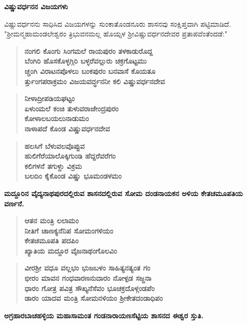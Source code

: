 \noindent
\textbf{ವಿಷ್ಣುವರ್ಧನನ ವಿಜಯಗಳು}

ವಿಷ್ಣುವರ್ಧನನು ಸಾಧಿಸಿದ ವಿಜಯಗಳನ್ನು ಸುಂಕಾತೊಂಡನೂರು ಶಾಸನವು ಸಂಕ್ಷಿಪ್ತವಾಗಿ ಪಟ್ಟಿಮಾಡಿದೆ. "ಶ‍್ರೀಮನ್ಮಹಾಮಂಡಲೇಶ್ವರಂ ತ್ರಿಭುವನಮಲ್ಲ ಹೊಯ್ಸಳ ಶ‍್ರೀವಿಷ್ಣುವರ್ಧನದೇವರ ಪ್ರತಾಪವೆಂತೆಂದಡೆ:"

\begin{verse}
\textbf{ನಂಗಲಿ ಕೊಂಗು ಸಿಂಗಮಲೆ ರಾಯಪುರಂ ತಳಕಾಡುರೊದ್ದ \\ ಬೆಂಗಿರಿ ಹೊಸಕೊಳ್ಳಗ್ಗಿರಿ ಬಳ್ಳರೆವಲ್ಲುರು ಚಕ್ರಗೊಟ್ಟಮು \\ ಚ್ಚಂಗಿ ವಿರಾಟನಪೊಳಲು ಬಂಕಪುರಂ ಬನವಾಸೆ ಕೊಯತೂ \\ರ್ತ್ತುಂಗಪರಾಕ್ರಮಂ ವಿಜಯವರ್ದ್ಧನನೀ ಕಲಿ ವಿಷ್ಣುವರ್ಧನದೇವ}
\end{verse}

\begin{verse}
\textbf{ನೀಳಾದ್ರೀಪಡಿಯಘಟ್ಟಂ \\ ಏಳುಂಮಲೆ ಕಂಚಿ ತುಳುವರಾಜೇಂದ್ರಪುರಂ \\ ಕೋಳಾಲಬಯಲುನಾಡುಮಂ \\ ನಾಳಾಪದೆ ಕೊಂಡ ವಿಷ್ಣುವರ್ಧನದೇವ}
\end{verse}

\begin{verse}
\textbf{ಹಲಸಿಗೆ ಬೆಳುವಲವೊಪ್ಪುವ \\ ಹುಲಿಗೆರೆಯಾಲೊಕ್ಕಿಗುಂಡಿ ಹೆದ್ದರೆವರೆಗಂ \\ ಕಲಿಗಳನೆ ತಗುಳ್ದು ವಿಕ್ರಮ \\ ಬಲದಿಂ ಕೈಕೊಂಡ ವಿಷ್ಣು ಭೂಮಂಡಳಮಂ}
\end{verse}

\noindent
\textbf{ಮದ್ದೂರಿನ ವೈದ್ಯನಾಥಪುರದಲ್ಲಿರುವ ಶಾಸನದಲ್ಲಿರುವ ಸೋಮ ದಂಡನಾಯಕನ ಅಳಿಯ ಕೇತಚಮೂಪತಿಯ ವರ್ಣನೆ.}

\begin{verse}
\textbf{ಆತನ ಮಂತ್ರಿ ಲಲಾಮಂ \\ ನೀತಿಗೆ ಚಾಣಕ್ಯನೆನಿಪ ಸೋಮಂಗಳಿಯಂ \\ ಕೇತಚಮೂಪತಿ ಪದಪಿಂ \\ ಖ್ಯಾತಿಯ ಮದ್ದೂರ ವೈಜನಾಥಂಗೊಲವಿಂ}
\end{verse}

\begin{verse}
\textbf{ವೀರಶ‍್ರೀ ವಧೂ ವಲ್ಲಭಂ ಭುಜಬಳಂ ಸಾಹಿತ್ಯನತ್ಯಂತ ಗಂ \\ ಭೀರಂ ಮಾವನ ಗಂಧವಾರಣನುದಾರಂ ನೋಳ್ಪಡ ಸಜ್ಜನಾ \\ ಧಾರಂ ಗೋತ್ರ ಪವಿತ್ರ ಸೌಖ್ಯನೆಸೆವಂ ಭೂಚಕ್ರದೊಳ್ಗಂಡಪೆಂ \\ ಡಾರಂ ಯಾದವ ಮಂತ್ರಿ ಸೋಮನಳಿಯಂ ಶ‍್ರೀಕೇತದಂಡಾಧಿಪಂ}
\end{verse}

\noindent
\textbf{ಅಗ್ರಹಾರಬಾಚಹಳ್ಳಿಯ ಮಹಾಸಾಮಂತ ಗಂಡನಾರಾಯಣಸೆಟ್ಟಿಯ ಶಾಸನದ ಈಶ್ವರ ಸ್ತುತಿ.}

